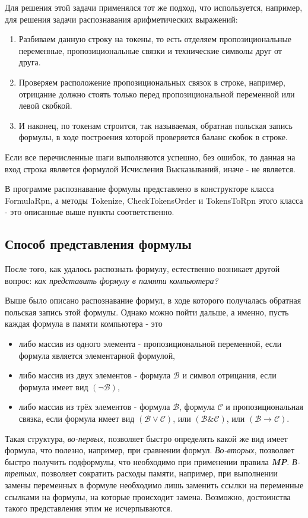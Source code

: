\documentclass[a4paper,12pt]{article}
\theoremstyle{definition}
\begin{document}
	Для решения этой задачи применялся тот же подход, что используется, например, для решения задачи распознавания арифметических выражений:
	\begin{enumerate}
		\item Разбиваем данную строку на токены, то есть отделяем пропозициональные переменные, пропозициональные связки и технические символы друг от друга.
		\item Проверяем расположение пропозициональных связок в строке, например, отрицание должно стоять только перед пропозициональной переменной или левой скобкой.
		\item И наконец, по токенам строится, так называемая, обратная польская запись формулы, в ходе построения которой проверяется баланс скобок в строке.
	\end{enumerate} 
	Если все перечисленные шаги выполняются успешно, без ошибок, то данная на вход строка является формулой Исчисления Высказываний, иначе - не является.
	
	В программе распознавание формулы представлено в конструкторе класса FormulaRpn, а методы Tokenize, CheckTokensOrder и TokensToRpn этого класса - это описанные выше пункты соответственно.
	
	
	\subsection{Способ представления формулы}
	После того, как удалось распознать формулу, естественно возникает другой вопрос: \textit{как представить формулу в памяти компьютера?}
	
	Выше было описано распознавание формул, в ходе которого получалась обратная польская запись этой формулы. Однако можно пойти дальше, а именно, пусть каждая формула в памяти компьютера - это
	\begin{itemize}
		\item либо массив из одного элемента - пропозициональной переменной, если формула является элементарной формулой,
		\item либо массив из двух элементов - формула $\mathcal{B}$ и символ отрицания, если формула имеет вид $ \left(\lnot \mathcal{B}\right)  $,
		\item либо массив из трёх элементов - формула $\mathcal{B}$, формула $\mathcal{C}$ и пропозициональная связка, если формула имеет вид $\left( \mathcal{B} \lor \mathcal{C} \right)$, или $
		\left( \mathcal{B} \& \mathcal{C}\right)$, или $  
		\left( \mathcal{B} \to \mathcal{C}\right)$.
	\end{itemize}
	Такая структура, \textit{во-первых}, позволяет быстро определять какой же вид имеет формула, что полезно, например, при сравнении формул. \textit{Во-вторых}, позволяет быстро получить подформулы, что необходимо при применении правила \textbf{\textit{MP}}. \textit{В-третьих}, позволяет сократить расходы памяти, например, при выполнении замены переменных в формуле необходимо лишь заменить ссылки на переменные ссылками на формулы, на которые происходит замена. Возможно, достоинства такого представления этим не исчерпываются. 
	
\end{document}
